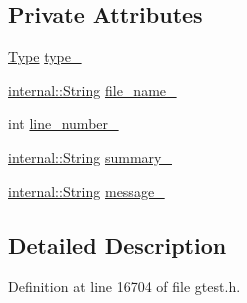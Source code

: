 \subsection*{\-Private \-Attributes}
\begin{DoxyCompactItemize}
\item 
\hyperlink{classtesting_1_1TestPartResult_a1d1cfd8ffb84e947f82999c682b666a7}{\-Type} \hyperlink{classtesting_1_1TestPartResult_ae96b07c06ceff094f476fd92cbe89e10}{type\-\_\-}
\item 
\hyperlink{classtesting_1_1internal_1_1String}{internal\-::\-String} \hyperlink{classtesting_1_1TestPartResult_a7165c07ab2b8f8d7ce5254d3384a32a3}{file\-\_\-name\-\_\-}
\item 
int \hyperlink{classtesting_1_1TestPartResult_ac2abc3804f68a1a280e475701fe4eeb1}{line\-\_\-number\-\_\-}
\item 
\hyperlink{classtesting_1_1internal_1_1String}{internal\-::\-String} \hyperlink{classtesting_1_1TestPartResult_a76f786d3c0a513571049db63b2ddf21b}{summary\-\_\-}
\item 
\hyperlink{classtesting_1_1internal_1_1String}{internal\-::\-String} \hyperlink{classtesting_1_1TestPartResult_ac876aff75e911570267d23362033fc34}{message\-\_\-}
\end{DoxyCompactItemize}


\subsection{\-Detailed \-Description}


\-Definition at line 16704 of file gtest.\-h.




